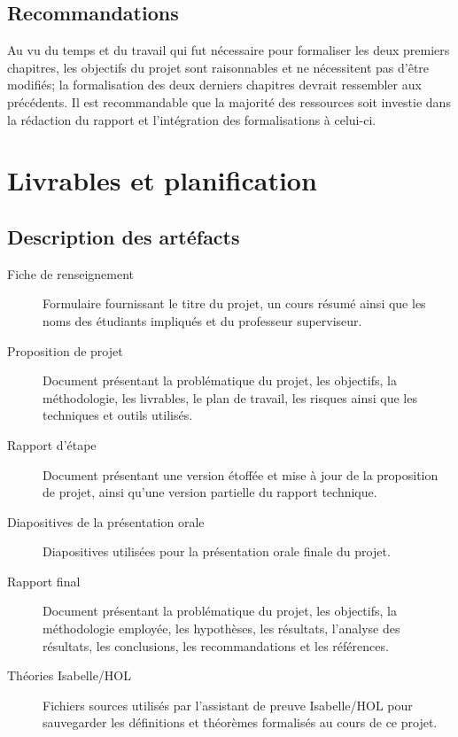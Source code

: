 \documentclass[a4paper, oneside, 12pt, titlepage]{article}
\begin{document}
\subsection{Recommandations}


Au vu du temps et du travail qui fut nécessaire pour formaliser les deux premiers chapitres, les
objectifs du projet sont raisonnables et ne nécessitent pas d'être modifiés; la formalisation des
deux derniers chapitres devrait ressembler aux précédents. Il est recommandable que la majorité
des ressources soit investie dans la rédaction du rapport et l'intégration des formalisations à
celui-ci.

\section{Livrables et planification}

\subsection{Description des artéfacts}


\begin{description}
  \item[Fiche de renseignement]
    Formulaire fournissant le titre du projet, un cours résumé ainsi que les noms des étudiants
    impliqués et du professeur superviseur.
  \item[Proposition de projet]
    Document présentant la problématique du projet, les objectifs, la méthodologie, les livrables,
    le plan de travail, les risques ainsi que les techniques et outils utilisés.
  \item[Rapport d'étape]
    Document présentant une version étoffée et mise à jour de la proposition de projet, ainsi qu'une
    version partielle du rapport technique.
  \item[Diapositives de la présentation orale]
    Diapositives utilisées pour la présentation orale finale du projet.
  \item[Rapport final]
    Document présentant la problématique du projet, les objectifs, la méthodologie employée, les
    hypothèses, les résultats, l'analyse des résultats, les conclusions, les recommandations et les
    références.
  \item[Théories Isabelle/HOL]
    Fichiers sources utilisés par l'assistant de preuve Isabelle/HOL pour sauvegarder les
    définitions et théorèmes formalisés au cours de ce projet.
\end{description}
\end{document}
